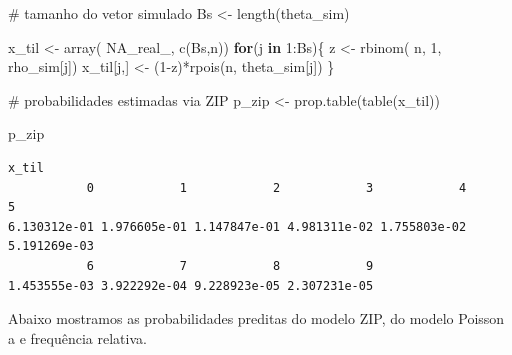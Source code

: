 \documentclass[
  letterpaper,
  DIV=11,
  numbers=noendperiod]{scrreprt}
\newenvironment{Shaded}{\begin{snugshade}}{\end{snugshade}}
\newcommand{\CommentTok}[1]{\textcolor[rgb]{0.37,0.37,0.37}{#1}}
\newcommand{\ConstantTok}[1]{\textcolor[rgb]{0.56,0.35,0.01}{#1}}
\newcommand{\ControlFlowTok}[1]{\textcolor[rgb]{0.00,0.23,0.31}{\textbf{#1}}}
\newcommand{\DecValTok}[1]{\textcolor[rgb]{0.68,0.00,0.00}{#1}}
\newcommand{\FunctionTok}[1]{\textcolor[rgb]{0.28,0.35,0.67}{#1}}
\newcommand{\NormalTok}[1]{\textcolor[rgb]{0.00,0.23,0.31}{#1}}
\newcommand{\OtherTok}[1]{\textcolor[rgb]{0.00,0.23,0.31}{#1}}
\newcommand{\SpecialCharTok}[1]{\textcolor[rgb]{0.37,0.37,0.37}{#1}}
\theoremstyle{definition}
\theoremstyle{definition}
\theoremstyle{plain}
\theoremstyle{remark}
\begin{document}
\begin{Shaded}
\begin{Highlighting}[]
\CommentTok{\# tamanho do vetor simulado}
\NormalTok{Bs }\OtherTok{\textless{}{-}} \FunctionTok{length}\NormalTok{(theta\_sim)}

\NormalTok{x\_til }\OtherTok{\textless{}{-}} \FunctionTok{array}\NormalTok{( }\ConstantTok{NA\_real\_}\NormalTok{, }\FunctionTok{c}\NormalTok{(Bs,n))}
\ControlFlowTok{for}\NormalTok{(j }\ControlFlowTok{in} \DecValTok{1}\SpecialCharTok{:}\NormalTok{Bs)\{}
\NormalTok{  z }\OtherTok{\textless{}{-}} \FunctionTok{rbinom}\NormalTok{( n, }\DecValTok{1}\NormalTok{, rho\_sim[j])}
\NormalTok{  x\_til[j,] }\OtherTok{\textless{}{-}}\NormalTok{ (}\DecValTok{1}\SpecialCharTok{{-}}\NormalTok{z)}\SpecialCharTok{*}\FunctionTok{rpois}\NormalTok{(n, theta\_sim[j])}
\NormalTok{\}}

\CommentTok{\# probabilidades estimadas via ZIP}
\NormalTok{p\_zip }\OtherTok{\textless{}{-}} \FunctionTok{prop.table}\NormalTok{(}\FunctionTok{table}\NormalTok{(x\_til))}

\NormalTok{p\_zip}
\end{Highlighting}
\end{Shaded}

\begin{verbatim}
x_til
           0            1            2            3            4            5 
6.130312e-01 1.976605e-01 1.147847e-01 4.981311e-02 1.755803e-02 5.191269e-03 
           6            7            8            9 
1.453555e-03 3.922292e-04 9.228923e-05 2.307231e-05 
\end{verbatim}

Abaixo mostramos as probabilidades preditas do modelo ZIP, do modelo
Poisson a e frequência relativa.
\end{document}
